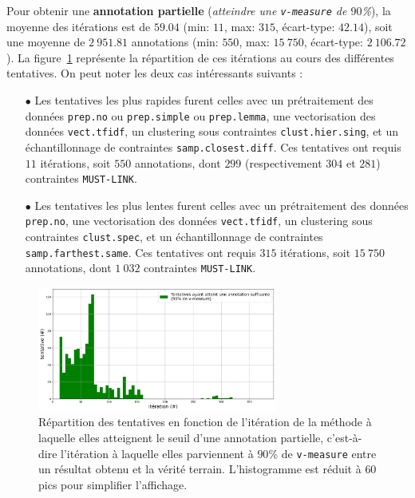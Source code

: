 			Pour obtenir une \textbf{annotation partielle} (\textit{atteindre une \texttt{v-measure} de $90$\%}), la moyenne des itérations est de $59.04$ (min: $11$, max: $315$, écart-type: $42.14$), soit une moyenne de $2~951.81$ annotations (min: $550$, max: $15~750$, écart-type: $2~106.72$).
			La figure~\ref{figure:4.2.1-ETUDE-OPTIMISATION-HISTOGRAMME-ANNOTATION-PARTIELLE} représente la répartition de ces itérations au cours des différentes tentatives.
			On peut noter les deux cas intéressants suivants :
			\begin{itemize}
				\item[$\bullet$] Les tentatives les plus rapides furent celles avec un prétraitement des données \texttt{prep.no} ou \texttt{prep.simple} ou \texttt{prep.lemma}, une vectorisation des données \texttt{vect.tfidf}, un clustering sous contraintes \texttt{clust.hier.sing}, et un échantillonnage de contraintes \texttt{samp.closest.diff}. Ces tentatives ont requis $11$ itérations, soit $550$ annotations, dont $299$ (respectivement $304$ et $281$) contraintes \texttt{MUST-LINK}.
				\item[$\bullet$] Les tentatives les plus lentes furent celles avec un prétraitement des données \texttt{prep.no}, une vectorisation des données \texttt{vect.tfidf}, un clustering sous contraintes \texttt{clust.spec}, et un échantillonnage de contraintes \texttt{samp.farthest.same}. Ces tentatives ont requis $315$ itérations, soit $15~750$ annotations, dont $1~032$ contraintes \texttt{MUST-LINK}.
			\end{itemize}
			\begin{figure}[!htb]
				\centering
				\includegraphics[width=0.7\textwidth]{figures/etude-efficience-histogramme-annotation-partielle}
				\caption{Répartition des tentatives en fonction de l'itération de la méthode à laquelle elles atteignent le seuil d'une annotation partielle, c'est-à-dire l'itération à laquelle elles parviennent à $90$\% de \texttt{v-measure} entre un résultat obtenu et la vérité terrain. L'histogramme est réduit à $60$ pics pour simplifier l'affichage.}
				\label{figure:4.2.1-ETUDE-OPTIMISATION-HISTOGRAMME-ANNOTATION-PARTIELLE}
			\end{figure}
